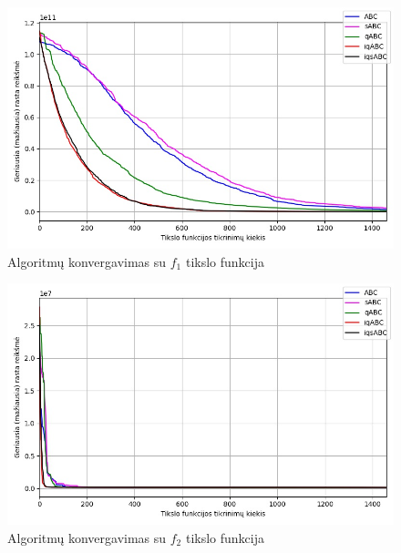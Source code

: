 \documentclass{VUMIFKompMagistrinis}
\begin{document}
\begin{landscape}
\begin{multicols}{2}
\begin{figure}[H]
    \centering
    \includegraphics[scale=0.45]{img/2kv/all_f1.jpg}
    \caption{Algoritmų konvergavimas su $f_{1}$ tikslo funkcija}
    \label{img:konf1}
\end{figure}

\begin{figure}[H]
    \centering
    \includegraphics[scale=0.45]{img/2kv/all_f2.jpg}
    \caption{Algoritmų konvergavimas su $f_{2}$ tikslo funkcija}
    \label{img:konf2}
\end{figure}





\end{multicols}\newpage
\begin{multicols}{2}


\end{multicols}
\end{landscape}
\end{document}
